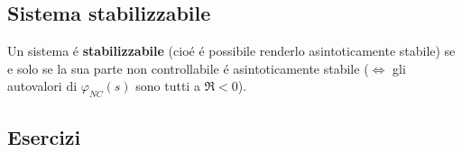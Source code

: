 \documentclass[../main.tex]{subfiles}
\begin{document}
	\subsection{Sistema stabilizzabile}
		Un sistema \'e \textbf{stabilizzabile} (cio\'e \'e possibile renderlo asintoticamente stabile) se e solo se la sua parte non controllabile \'e asintoticamente stabile ($ \Leftrightarrow $ gli autovalori di $ \varphi_{NC}(s) $ sono tutti a $ \Re < 0 $).
	
	\subsection{Esercizi}
		
\end{document}
